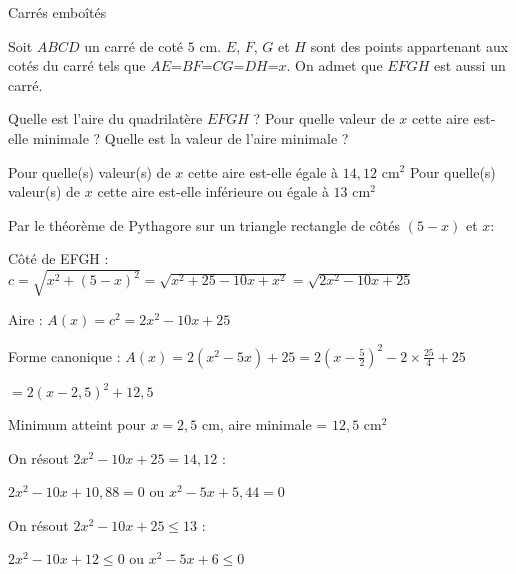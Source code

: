 \begin{EXO}{Carrés emboîtés}{}

\begin{MultiColonnes}{2}
\tcbitem Soit $ABCD$ un carré de coté $5$ cm. $E$, $F$, $G$ et $H$ sont des points appartenant aux cotés du carré tels que $AE$=$BF$=$CG$=$DH$=$x$. On admet que $EFGH$ est aussi un carré.
\begin{tcbenumerate}[1]
\tcbitem {} Quelle est l'aire du quadrilatère $EFGH$ ?
\tcbitem {} Pour quelle valeur de $x$ cette aire est-elle minimale ? Quelle est la valeur de l'aire minimale ?
\end{tcbenumerate}
\tcbitem[halign=center] 
\end{MultiColonnes}
\begin{tcbenumerate}[1][3]
\tcbitem {} Pour quelle(s) valeur(s) de $x$ cette aire est-elle égale à $14,12$ cm$^2$
\tcbitem {} Pour quelle(s) valeur(s) de $x$ cette aire est-elle inférieure ou égale à $13$ cm$^2$
\end{tcbenumerate}

\exocorrection

\begin{tcbenumerate}[1]
\tcbitem Par le théorème de Pythagore sur un triangle rectangle de côtés $(5-x)$ et $x$:

Côté de EFGH : $c = \sqrt{x^2 + (5-x)^2} = \sqrt{x^2 + 25 - 10x + x^2} = \sqrt{2x^2 - 10x + 25}$

Aire : $A(x) = c^2 = 2x^2 - 10x + 25$

\tcbitem Forme canonique : $A(x) = 2(x^2 - 5x) + 25 = 2(x-\frac{5}{2})^2 - 2 \times \frac{25}{4} + 25$

$= 2(x-2,5)^2 + 12,5$

Minimum atteint pour $x = 2,5$ cm, aire minimale = $12,5$ cm$^2$
\end{tcbenumerate}

\vspace{2mm}

\begin{tcbenumerate}[1][3]
\tcbitem On résout $2x^2 - 10x + 25 = 14,12$ :

$2x^2 - 10x + 10,88 = 0$ ou $x^2 - 5x + 5,44 = 0$

\end{tcbenumerate}

\vspace{2mm}

\begin{tcbenumerate}[1][4]
\tcbitem On résout $2x^2 - 10x + 25 \leq 13$ :

$2x^2 - 10x + 12 \leq 0$ ou $x^2 - 5x + 6 \leq 0$

\end{tcbenumerate}
\end{EXO}
